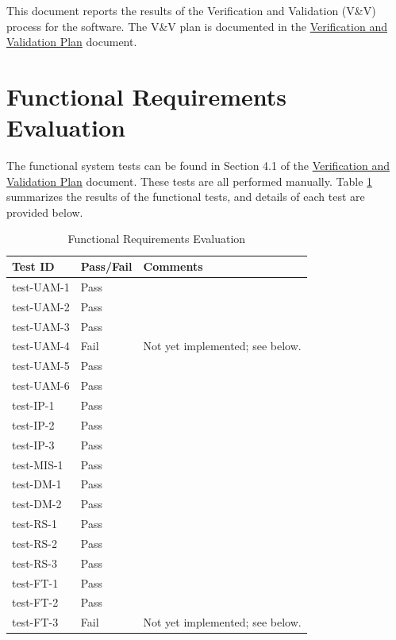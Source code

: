 \documentclass[12pt, titlepage]{article}
\begin{document}
\newpage

\tableofcontents

\listoftables %

\listoffigures %

\newpage


This document reports the results of the Verification and Validation (V\&V)
process for the \progname software. The V\&V plan is documented in the
\href{https://github.com/PlutosCapstone/Plutos/blob/main/docs/VnVPlan/VnVPlan.pdf}{Verification
and Validation Plan} document. 

\section{Functional Requirements Evaluation}

The functional system tests can be found in Section 4.1 of the
\href{https://github.com/PlutosCapstone/Plutos/blob/main/docs/VnVPlan/VnVPlan.pdf}{Verification
and Validation Plan} document. These tests are all performed manually. Table
\ref{tab:functional-requirements-evaluation} summarizes the results of the
functional tests, and details of each test are provided below.

\newpage

\begin{table}[h!]
\centering
\caption{Functional Requirements Evaluation}\label{tab:functional-requirements-evaluation}
\begin{tabularx}{\textwidth}{>{\centering\arraybackslash}X >{\centering\arraybackslash}X >{\centering\arraybackslash}X}
  \toprule
  \textbf{Test ID} & \textbf{Pass/Fail} & \textbf{Comments} \\
  \midrule
  test-UAM-1 & Pass &  \\
  test-UAM-2 & Pass &  \\
  test-UAM-3 & Pass &  \\
  test-UAM-4 & Fail & Not yet implemented; see below. \\
  test-UAM-5 & Pass &  \\
  test-UAM-6 & Pass &  \\
  \midrule
  test-IP-1 & Pass & \\
  test-IP-2 & Pass & \\
  test-IP-3 & Pass & \\
  \midrule
  test-MIS-1 & Pass & \\
  \midrule
  test-DM-1 & Pass & \\
  test-DM-2 & Pass & \\
  \midrule
  test-RS-1 & Pass & \\
  test-RS-2 & Pass & \\
  test-RS-3 & Pass & \\
  \midrule
  test-FT-1 & Pass & \\
  test-FT-2 & Pass & \\
  test-FT-3 & Fail & Not yet implemented; see below. \\
  \bottomrule
\end{tabularx}
\end{table}
\end{document}
